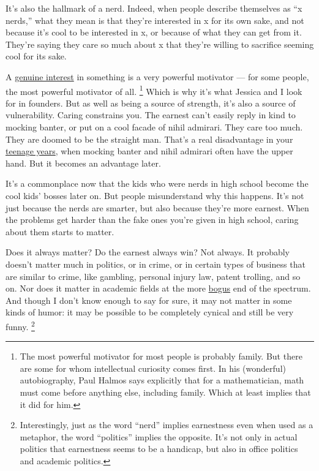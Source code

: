 \documentclass[12pt]{book}
\begin{document}
It's also the hallmark of a nerd. Indeed, when people describe
themselves as ``x nerds,'' what they mean is that they're interested in
x for its own sake, and not because it's cool to be interested in x, or
because of what they can get from it. They're saying they care so much
about x that they're willing to sacrifice seeming cool for its sake.

A \href{genius.html}{genuine interest} in something is a very powerful
motivator --- for some people, the most powerful motivator of all.
\footnote{The most powerful motivator for most people is probably family.
But there are some for whom intellectual curiosity comes first. In his
(wonderful) autobiography, Paul Halmos says explicitly that for a
mathematician, math must come before anything else, including family.
Which at least implies that it did for him.} Which is why it's what Jessica and I look for in
founders. But as well as being a source of strength, it's also a source
of vulnerability. Caring constrains you. The earnest can't easily reply
in kind to mocking banter, or put on a cool facade of nihil admirari.
They care too much. They are doomed to be the straight man. That's a
real disadvantage in your \href{nerds.html}{teenage years}, when mocking
banter and nihil admirari often have the upper hand. But it becomes an
advantage later.

It's a commonplace now that the kids who were nerds in high school
become the cool kids' bosses later on. But people misunderstand why this
happens. It's not just because the nerds are smarter, but also because
they're more earnest. When the problems get harder than the fake ones
you're given in high school, caring about them starts to matter.

Does it always matter? Do the earnest always win? Not always. It
probably doesn't matter much in politics, or in crime, or in certain
types of business that are similar to crime, like gambling, personal
injury law, patent trolling, and so on. Nor does it matter in academic
fields at the more
\href{https://scholar.google.com/scholar?hl=en&as_sdt=0\%2C5&q=hermeneutic+dialectics+hegemonic+phenomenology+intersectionality}{bogus}
end of the spectrum. And though I don't know enough to say for sure, it
may not matter in some kinds of humor: it may be possible to be
completely cynical and still be very funny. \footnote{Interestingly, just as the word ``nerd'' implies earnestness
even when used as a metaphor, the word ``politics'' implies the
opposite. It's not only in actual politics that earnestness seems to be
a handicap, but also in office politics and academic politics.}
\end{document}

